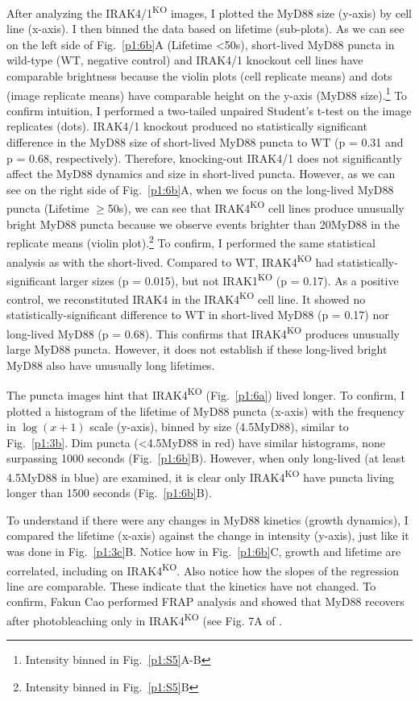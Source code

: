 After analyzing the IRAK4/1\textsuperscript{KO} images, I plotted the MyD88 size (y-axis) by cell line (x-axis). I then binned the data based on lifetime (sub-plots). As we can see on the left side of Fig.~\ref{p1:6b}A (Lifetime <50s), short-lived MyD88 puncta in wild-type (WT, negative control) and IRAK4/1 knockout cell lines have comparable brightness because the violin plots (cell replicate means) and dots (image replicate means) have comparable height on the y-axis (MyD88 size).\footnote{Intensity binned in Fig.~\ref{p1:S5}A-B} To confirm intuition, I performed a two-tailed unpaired Student's t-test on the image replicates (dots). IRAK4/1 knockout produced no statistically significant difference in the MyD88 size of short-lived MyD88 puncta to WT (p = 0.31 and p = 0.68, respectively). Therefore, knocking-out IRAK4/1 does not significantly affect the MyD88 dynamics and size in short-lived puncta. However, as we can see on the right side of Fig.~\ref{p1:6b}A, when we focus on the long-lived MyD88 puncta (Lifetime $\geq$50s), we can see that IRAK4\textsuperscript{KO} cell lines produce unusually bright MyD88 puncta because we observe events brighter than 20\times MyD88 in the replicate means (violin plot).\footnote{Intensity binned in Fig.~\ref{p1:S5}B} To confirm, I performed the same statistical analysis as with the short-lived. Compared to WT, IRAK4\textsuperscript{KO} had statistically-significant larger sizes (p = 0.015), but not IRAK1\textsuperscript{KO} (p = 0.17). As a positive control, we reconstituted IRAK4 in the IRAK4\textsuperscript{KO} cell line. It showed no statistically-significant difference to WT in short-lived MyD88 (p = 0.17) nor long-lived MyD88 (p = 0.68). This confirms that IRAK4\textsuperscript{KO} produces unusually large MyD88 puncta. However, it does not establish if these long-lived bright MyD88 also have unusually long lifetimes.

The puncta images hint that IRAK4\textsuperscript{KO} (Fig.~\ref{p1:6a}) lived longer. To confirm, I plotted a histogram of the lifetime of MyD88 puncta (x-axis) with the frequency in $\log(x+1)$ scale (y-axis), binned by size (4.5\times MyD88), similar to Fig.~\ref{p1:3b}. Dim puncta (<4.5\times MyD88 in red) have similar histograms, none surpassing 1000 seconds (Fig.~\ref{p1:6b}B). However, when only long-lived (at least 4.5\times MyD88 in blue) are examined, it is clear only IRAK4\textsuperscript{KO} have puncta living longer than 1500 seconds (Fig.~\ref{p1:6b}B).

To understand if there were any changes in MyD88 kinetics (growth dynamics), I compared the lifetime (x-axis) against the change in intensity (y-axis), just like it was done in Fig.~\ref{p1:3c}B. Notice how in Fig.~\ref{p1:6b}C, growth and lifetime are correlated, including on IRAK4\textsuperscript{KO}. Also notice how the slopes of the regression line are comparable. These indicate that the kinetics have not changed. To confirm, Fakun Cao performed FRAP analysis and showed that MyD88 recovers after photobleaching only in IRAK4\textsuperscript{KO} (see Fig. 7A of \autocite{Deliz-Aguirre_2021}.

